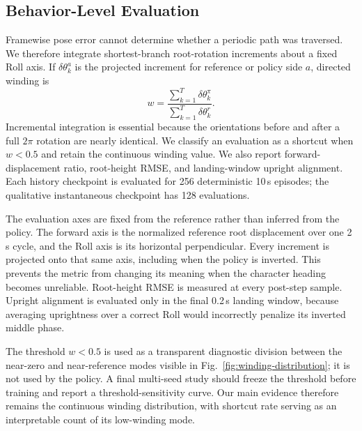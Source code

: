 \subsection{Behavior-Level Evaluation}

Framewise pose error cannot determine whether a periodic path was traversed.
We therefore integrate shortest-branch root-rotation increments about a fixed
Roll axis.  If $\delta\theta_k^a$ is the projected increment for reference or
policy side $a$, directed winding is
\begin{equation}
 w=\frac{\sum_{k=1}^{T}\delta\theta_k^\pi}
 {\sum_{k=1}^{T}\delta\theta_k^r}.
 \label{eq:winding}
\end{equation}
Incremental integration is essential because the orientations before and
after a full $2\pi$ rotation are nearly identical.  We classify an evaluation
as a shortcut when $w<0.5$ and retain the continuous winding value.  We also
report forward-displacement ratio, root-height RMSE, and landing-window upright
alignment.  Each history checkpoint is evaluated for 256 deterministic
10\,s episodes; the qualitative instantaneous checkpoint has 128 evaluations.

The evaluation axes are fixed from the reference rather than inferred from the
policy.  The forward axis is the normalized reference root displacement over
one 2\,s cycle, and the Roll axis is its horizontal perpendicular.  Every
increment is projected onto that same axis, including when the policy is
inverted.  This prevents the metric from changing its meaning when the
character heading becomes unreliable.  Root-height RMSE is measured at every
post-step sample.  Upright alignment is evaluated only in the final 0.2\,s
landing window, because averaging uprightness over a correct Roll would
incorrectly penalize its inverted middle phase.

The threshold $w<0.5$ is used as a transparent diagnostic division between the
near-zero and near-reference modes visible in Fig.~\ref{fig:winding-distribution};
it is not used by the policy.  A final multi-seed study should freeze the
threshold before training and report a threshold-sensitivity curve.  Our main
evidence therefore remains the continuous winding distribution, with shortcut
rate serving as an interpretable count of its low-winding mode.

